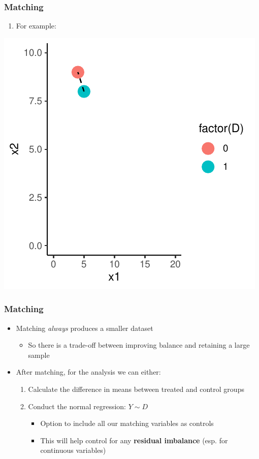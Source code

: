 \documentclass[xcolor=x11names,compress]{beamer}\usepackage[]{graphicx}\usepackage[]{color}
\makeatletter
\def\maxwidth{ %
  \ifdim\Gin@nat@width>\linewidth
    \linewidth
  \else
    \Gin@nat@width
  \fi
}
\newenvironment{knitrout}{}{} %
\renewcommand{\(}{\begin{columns}}
\renewcommand{\)}{\end{columns}}
\newcommand{\<}[1]{\begin{column}{#1}}
\renewcommand{\>}{\end{column}}
\makeatother
\begin{document}
\begin{frame}
\frametitle{Matching}
\begin{enumerate}
\item For example:
\end{enumerate}
\begin{knitrout}
\color{fgcolor}
\includegraphics[width=\maxwidth]{figure/unnamed-chunk-3-1} 

\end{knitrout}
\end{frame}

\begin{frame}
\frametitle{Matching}
\begin{itemize}
\item Matching \textit{always} produces a smaller dataset
\pause
\begin{itemize}
\item So there is a trade-off between improving balance and retaining a large sample
\end{itemize}
\pause
\item After matching, for the analysis we can either:
\begin{enumerate}
\item Calculate the difference in means between treated and control groups
\pause
\item Conduct the normal regression: $Y \sim D$
\begin{itemize}
\item Option to include all our matching variables as controls
\item This will help control for any \textbf{residual imbalance} (esp. for continuous variables)
\end{itemize}
\end{enumerate}
\end{itemize}
\end{frame}
\end{document}
